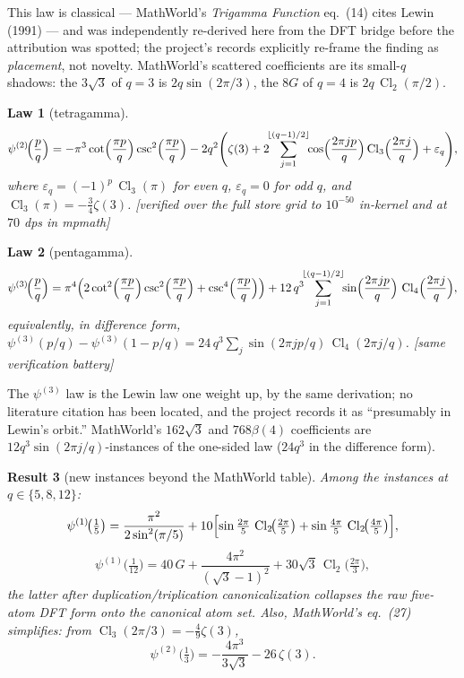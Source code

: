 \documentclass[11pt]{article}
\newtheorem{result}{Result}[section]
\newtheorem{law}[result]{Law}
\theoremstyle{remark}
\newcommand{\Cl}{\operatorname{Cl}}
\newcommand{\Catalan}{G}
\newcommand{\dps}[1]{\textsf{\footnotesize[#1]}}
\begin{document}
This law is classical --- MathWorld's \emph{Trigamma Function} eq.~(14) cites Lewin
(1991) \cite{Lewin} --- and was independently re-derived here from the DFT bridge before the attribution
was spotted; the project's records explicitly re-frame the finding as \emph{placement},
not novelty. MathWorld's scattered coefficients are its small-$q$ shadows: the $3\sqrt3$
of $q=3$ is $2q\sin(2\pi/3)$, the $8\Catalan$ of $q=4$ is $2q\,\Cl_2(\pi/2)$.

\begin{law}[tetragamma]\label{law:psi2}
\[
\psi^{(2)}\!\Bigl(\frac{p}{q}\Bigr)
=-\pi^3\cot\Bigl(\frac{\pi p}{q}\Bigr)\csc^2\Bigl(\frac{\pi p}{q}\Bigr)
-2q^2\Biggl(\zeta(3)
+2\!\!\sum_{j=1}^{\lfloor(q-1)/2\rfloor}\!\!\cos\Bigl(\frac{2\pi jp}{q}\Bigr)
\Cl_3\Bigl(\frac{2\pi j}{q}\Bigr)+\varepsilon_q\Biggr),
\]
where $\varepsilon_q=(-1)^p\,\Cl_3(\pi)$ for even $q$, $\varepsilon_q=0$ for odd $q$,
and $\Cl_3(\pi)=-\tfrac34\zeta(3)$.
\dps{verified over the full store grid to $10^{-50}$ in-kernel and at $70$ dps in mpmath}
\end{law}

\begin{law}[pentagamma]\label{law:psi3}
\[
\psi^{(3)}\!\Bigl(\frac{p}{q}\Bigr)
=\pi^4\Bigl(2\cot^2\Bigl(\frac{\pi p}{q}\Bigr)\csc^2\Bigl(\frac{\pi p}{q}\Bigr)
+\csc^4\Bigl(\frac{\pi p}{q}\Bigr)\Bigr)
+12\,q^3\!\!\sum_{j=1}^{\lfloor(q-1)/2\rfloor}\!\!\sin\Bigl(\frac{2\pi jp}{q}\Bigr)\,
\Cl_4\Bigl(\frac{2\pi j}{q}\Bigr),
\]
equivalently, in difference form,
$\psi^{(3)}(p/q)-\psi^{(3)}(1-p/q)=24\,q^3\sum_j\sin(2\pi jp/q)\,\Cl_4(2\pi j/q)$.
\dps{same verification battery}
\end{law}

The $\psi^{(3)}$ law is the Lewin law one weight up, by the same derivation; no literature
citation has been located, and the project records it as ``presumably in Lewin's orbit.''
MathWorld's $162\sqrt3$ and $768\beta(4)$ coefficients are $12q^3\sin(2\pi j/q)$-instances
of the one-sided law ($24q^3$ in the difference form).

\begin{result}[new instances beyond the MathWorld table]\label{res:newinstances}
Among the instances at $q\in\{5,8,12\}$:
\[
\psi^{(1)}\!\bigl(\tfrac15\bigr)
=\frac{\pi^2}{2\sin^2(\pi/5)}
+10\Bigl[\sin\tfrac{2\pi}{5}\,\Cl_2\!\bigl(\tfrac{2\pi}{5}\bigr)
+\sin\tfrac{4\pi}{5}\,\Cl_2\!\bigl(\tfrac{4\pi}{5}\bigr)\Bigr],
\]
\[
\psi^{(1)}\!\bigl(\tfrac1{12}\bigr)
=40\,\Catalan+\frac{4\pi^2}{(\sqrt3-1)^2}+30\sqrt3\,\Cl_2\!\bigl(\tfrac{2\pi}{3}\bigr),
\]
the latter after duplication/triplication canonicalization collapses the raw five-atom DFT
form onto the canonical atom set. Also, MathWorld's eq.~(27) simplifies: from
$\Cl_3(2\pi/3)=-\tfrac49\zeta(3)$,
\[
\psi^{(2)}\!\bigl(\tfrac13\bigr)=-\frac{4\pi^3}{3\sqrt3}-26\,\zeta(3).
\]
\end{result}
\end{document}
